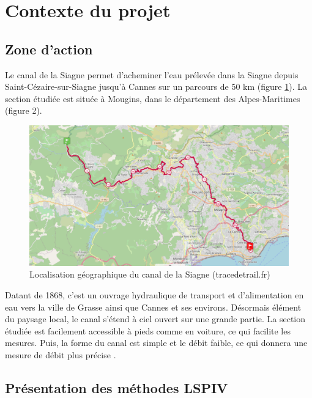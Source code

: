 \documentclass[
]{article}
\begin{document}
\newpage

\hypertarget{contexte-du-projet}{%
\section{Contexte du projet}\label{contexte-du-projet}}

\hypertarget{zone-daction}{%
\subsection{Zone d'action}\label{zone-daction}}

Le canal de la Siagne permet d'acheminer l'eau prélevée dans la Siagne depuis Saint-Cézaire-sur-Siagne jusqu'à Cannes sur un parcours de 50 km (figure \ref{fig:refsiagne}). La section étudiée est située à Mougins, dans le département des Alpes-Maritimes (figure 2).



\begin{figure}[H]
\includegraphics[width=1\linewidth,]{images/siagne} \caption{Localisation géographique du canal de la Siagne (tracedetrail.fr)}\label{fig:refsiagne}
\end{figure}

Datant de 1868, c'est un ouvrage hydraulique de transport et d'alimentation en eau vers la ville de Grasse ainsi que Cannes et ses environs.
Désormais élément du paysage local, le canal s'étend à ciel ouvert sur une grande partie.
La section étudiée est facilement accessible à pieds comme en voiture, ce qui facilite les mesures. Puis, la forme du canal est simple et le débit faible, ce qui donnera une mesure de débit plus précise \citep{noauthor_canaldelasiagnefr_2019}.

\hypertarget{pruxe9sentation-des-muxe9thodes-lspiv}{%
\subsection{Présentation des méthodes LSPIV}\label{pruxe9sentation-des-muxe9thodes-lspiv}}
\end{document}
